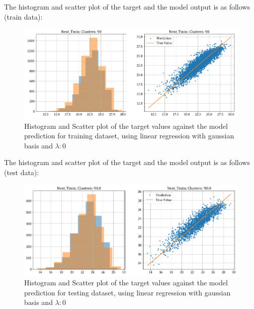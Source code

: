 \documentclass[12pt,a4paper]{article}
\newcommand{\noi}{\noindent}
\begin{document}
\noi
The histogram and scatter plot of the target and the model output is as follows (train data):
\begin{figure}[H]
     \centering
     \includegraphics[scale=0.49]{images/t3_d3/no_reg/T_min_nclu_90.png}
     \caption{Histogram and Scatter plot of the target values against the model prediction for training dataset, using linear regression with gaussian basis and $\lambda: 0$}
\end{figure}

\noi
The histogram and scatter plot of the target and the model output is as follows (test data):
\begin{figure}[H]
    \centering
    \includegraphics[scale=0.49]{images/t3_d3/no_reg/T_min_test.png}
    \caption{Histogram and Scatter plot of the target values against the model prediction for testing dataset, using linear regression with gaussian basis and $\lambda: 0$}
\end{figure}
\end{document}
